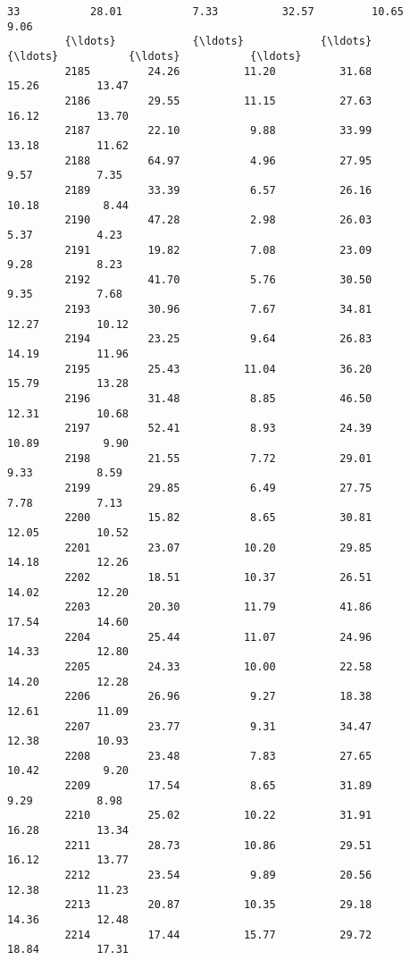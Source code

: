 \documentclass[11pt]{llncs}
\begin{document}
\begin{Verbatim}[commandchars=\\\{\}]
         33           28.01           7.33          32.57         10.65          9.06   
         {\ldots}            {\ldots}            {\ldots}            {\ldots}           {\ldots}           {\ldots}   
         2185         24.26          11.20          31.68         15.26         13.47   
         2186         29.55          11.15          27.63         16.12         13.70   
         2187         22.10           9.88          33.99         13.18         11.62   
         2188         64.97           4.96          27.95          9.57          7.35   
         2189         33.39           6.57          26.16         10.18          8.44   
         2190         47.28           2.98          26.03          5.37          4.23   
         2191         19.82           7.08          23.09          9.28          8.23   
         2192         41.70           5.76          30.50          9.35          7.68   
         2193         30.96           7.67          34.81         12.27         10.12   
         2194         23.25           9.64          26.83         14.19         11.96   
         2195         25.43          11.04          36.20         15.79         13.28   
         2196         31.48           8.85          46.50         12.31         10.68   
         2197         52.41           8.93          24.39         10.89          9.90   
         2198         21.55           7.72          29.01          9.33          8.59   
         2199         29.85           6.49          27.75          7.78          7.13   
         2200         15.82           8.65          30.81         12.05         10.52   
         2201         23.07          10.20          29.85         14.18         12.26   
         2202         18.51          10.37          26.51         14.02         12.20   
         2203         20.30          11.79          41.86         17.54         14.60   
         2204         25.44          11.07          24.96         14.33         12.80   
         2205         24.33          10.00          22.58         14.20         12.28   
         2206         26.96           9.27          18.38         12.61         11.09   
         2207         23.77           9.31          34.47         12.38         10.93   
         2208         23.48           7.83          27.65         10.42          9.20   
         2209         17.54           8.65          31.89          9.29          8.98   
         2210         25.02          10.22          31.91         16.28         13.34   
         2211         28.73          10.86          29.51         16.12         13.77   
         2212         23.54           9.89          20.56         12.38         11.23   
         2213         20.87          10.35          29.18         14.36         12.48   
         2214         17.44          15.77          29.72         18.84         17.31   
         

\end{Verbatim}
\end{document}
